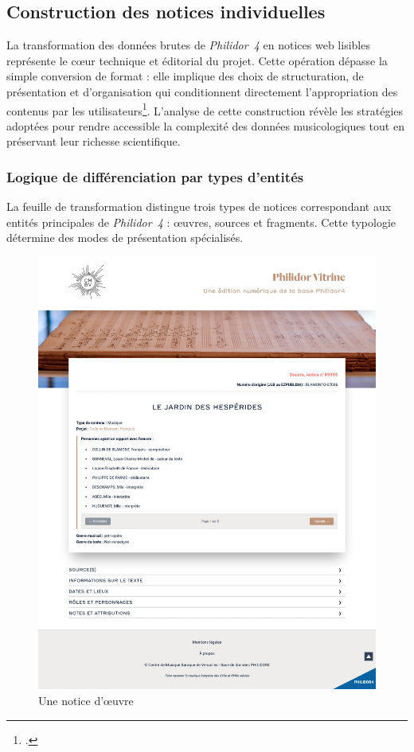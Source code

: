 \subsection{Construction des notices individuelles}

La transformation des données brutes de \textit{Philidor~4} en notices web lisibles représente le cœur technique et éditorial du projet. Cette opération dépasse la simple conversion de format : elle implique des choix de structuration, de présentation et d'organisation qui conditionnent directement l'appropriation des contenus par les utilisateurs\footcite{chartronEditionPublicationContenus2016}. L'analyse de cette construction révèle les stratégies adoptées pour rendre accessible la complexité des données musicologiques tout en préservant leur richesse scientifique.

\subsubsection{Logique de différenciation par types d'entités}

La feuille de transformation distingue trois types de notices correspondant aux entités principales de \textit{Philidor~4} : œuvres, sources et fragments. Cette typologie détermine des modes de présentation spécialisés.

\begin{figure}[p]
	\caption{Une notice d'œuvre} \label{notice-edition}
	\centering
	\includegraphics[width=\textwidth]{images/exemple-notice1-edition-philidor.jpeg}
\end{figure}

